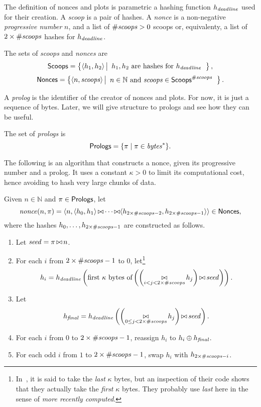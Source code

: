 %
The definition of nonces and plots is parametric \wrt a hashing
function $h_{\mathit{deadline}}$ used for their creation.
A \emph{scoop} is a pair of hashes.
A \emph{nonce} is a non-negative \emph{progressive number} $n$, and
a list of ${\#\mathit{scoops}}>0$ scoops or, equivalenty,
a list of $2\times{\#\mathit{scoops}}$ hashes for $h_{\mathit{deadline}}$.
%
\begin{definition}
  The sets of \emph{scoops} and \emph{nonces} are
  \[
  {\mathsf{Scoops}}=\left\{\langle h_1,h_2\rangle\left|\begin{array}{l}
  h_1,h_2\text{ are hashes for }h_{\mathit{deadline}}
  \end{array}\right.\right\},
  \]
  \[
  {\mathsf{Nonces}}=\left\{\langle n,{\mathit{scoops}}\rangle\left|\begin{array}{l}
  n\in\mathbb{N}\text{ and }{\mathit{scoops}}\in{\mathsf{Scoops}}^{\#\mathit{scoops}}
  \end{array}\right.\right\}.
  \]
\end{definition}
%
A \emph{prolog} is the identifier of the creator of nonces and plots.
For now, it is just a sequence of bytes. Later, we will give structure to prologs
and see how they can be useful.
%
\begin{definition}[Prolog]\label{def:prolog}
  The set of \emph{prologs} is
  \[
  {\mathsf{Prologs}}=\{\pi\mid\pi\in\mathit{bytes}^*\}.
  \]
\end{definition}
%
The following is an algorithm that constructs a nonce, given its progressive number and a prolog.
It uses a constant $\kappa>0$ to limit its computational cost, hence avoiding to hash
very large chunks of data.
%
\begin{definition}[$\nonce(n,\pi)$]\label{def:nonce_construction}
  Given $n\in\mathbb{N}$ and $\pi\in{\mathsf{Prologs}}$, let
  \[
  {\mathit{nonce}}(n,\pi)=\langle n,\langle h_0,h_1\rangle\operatorname*{\bowtie}
  \cdots\operatorname*{\bowtie}\langle h_{2\times{\#\mathit{scoops}}-2},h_{2\times{\#\mathit{scoops}}-1}\rangle\rangle\in{\mathsf{Nonces}},
  \]
  where the hashes $h_0,\ldots,h_{2\times{\#\mathit{scoops}}-1}$ are constructed as follows.
  \begin{enumerate}
  \item Let ${\mathit{seed}}=\pi\operatorname*{\bowtie} n$.
  \item For each $i$ from $2\times{\#\mathit{scoops}}-1$ to $0$,
    let\footnote{In~\cite{SignumPlotting}, it is said to
    take the \emph{last} $\kappa$ bytes, but an inspection of their code
    shows that they actually take the \emph{first} $\kappa$ bytes. They
    probably use \emph{last} here in the sense of \emph{more recently computed}.}
    \[
    h_i=h_{\mathit{deadline}}\left(\text{first $\kappa$ bytes of}\left(\left(\operatorname*{\bowtie}_{i<j<2\times{\#\mathit{scoops}}}h_j\right)\operatorname*{\bowtie}{\mathit{seed}}\right)\right).
    \]
  \item Let
    \[
    {h_{\mathit{final}}}=h_{\mathit{deadline}}\left(\left(\operatorname*{\bowtie}_{0\le j<2\times{\#\mathit{scoops}}}h_j\right)\operatorname*{\bowtie}{\mathit{seed}}\right).
    \]
  \item For each $i$ from $0$ to $2\times{\#\mathit{scoops}}-1$, reassign
    $h_i$ to $h_i\oplus{h_{\mathit{final}}}$.
  \item For each odd $i$ from $1$ to $2\times{\#\mathit{scoops}}-1$, swap
    $h_i$ with $h_{2\times{\#\mathit{scoops}}-i}$.
  \end{enumerate}
\end{definition}
